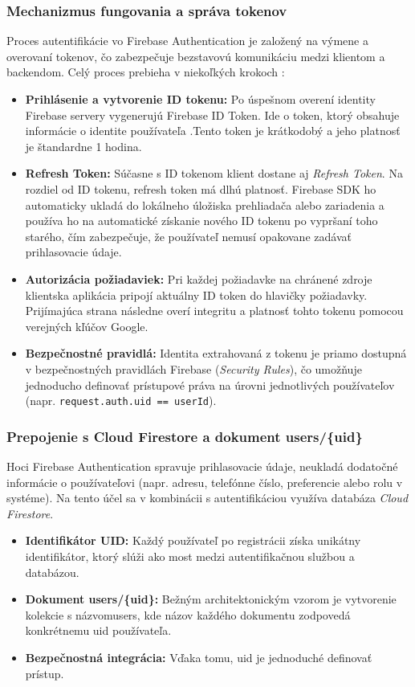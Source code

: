 \subsubsection{Mechanizmus fungovania a správa tokenov}
Proces autentifikácie vo Firebase Authentication je založený na výmene a overovaní tokenov, čo zabezpečuje
 bezstavovú komunikáciu medzi klientom a backendom. Celý proces prebieha v niekoľkých krokoch \cite{firebase_auth_docs}:
\begin{itemize}[noitemsep, topsep=0pt]
    \item \textbf{Prihlásenie a vytvorenie ID tokenu:} Po úspešnom overení identity Firebase servery vygenerujú
     Firebase ID Token. Ide o token, ktorý obsahuje informácie o identite používateľa 
    .Tento token je krátkodobý a jeho platnosť je štandardne 1 hodina.
    \item \textbf{Refresh Token:} Súčasne s ID tokenom klient dostane aj \textit{Refresh Token}. 
    Na rozdiel od ID tokenu, refresh token má dlhú platnosť. Firebase SDK ho automaticky ukladá 
    do lokálneho úložiska prehliadača alebo zariadenia a používa ho na automatické získanie nového 
    ID tokenu po vypršaní toho starého, čím zabezpečuje, že používateľ nemusí opakovane zadávať prihlasovacie údaje.
    \item \textbf{Autorizácia požiadaviek:} Pri každej požiadavke na chránené zdroje
     klientska aplikácia pripojí aktuálny
    ID token do hlavičky požiadavky. Prijímajúca strana následne overí integritu a
    platnosť tohto tokenu pomocou verejných kľúčov Google.
    \item \textbf{Bezpečnostné pravidlá:} Identita extrahovaná z tokenu je priamo dostupná v 
    bezpečnostných pravidlách Firebase (\textit{Security Rules}), čo umožňuje jednoducho 
    definovať prístupové práva na úrovni jednotlivých používateľov (napr. \texttt{request.auth.uid == userId}).
\end{itemize}

\subsubsection{Prepojenie s Cloud Firestore a dokument users/\{uid\}}
Hoci Firebase Authentication spravuje prihlasovacie údaje, neukladá dodatočné informácie o používateľovi 
(napr. adresu, telefónne číslo, preferencie alebo rolu v systéme). Na tento účel sa v kombinácii 
s autentifikáciou využíva databáza \textit{Cloud Firestore}.

\begin{itemize}
    \item \textbf{Identifikátor UID:} Každý používateľ po registrácii získa unikátny identifikátor, ktorý slúži ako most medzi autentifikačnou službou a databázou.
    \item \textbf{Dokument users/\{uid\}:} Bežným architektonickým vzorom je vytvorenie 
    kolekcie s názvomusers, kde názov každého dokumentu zodpovedá konkrétnemu uid používateľa. 
    \item \textbf{Bezpečnostná integrácia:} Vďaka tomu, uid je jednoduché definovať prístup.
\end{itemize}

